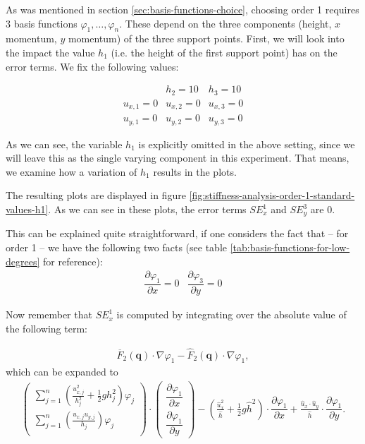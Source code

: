 \documentclass{article}
\newcommand{\pd}[2]{\dfrac{\partial #1}{\partial #2}}
\renewcommand{\phi}{\varphi}
\begin{document}
As was mentioned in section \ref{sec:basis-functions-choice}, choosing order 1 requires 3 basis functions $\phi_1,\dots,\phi_n$. These depend on the three components (height, $x$ momentum, $y$ momentum) of the three support points. First, we will look into the impact the value $h_1$ (i.e. the height of the first support point) has on the error terms. We fix the following values:

\begin{eqnarray*}
  & h_2 = 10 & h_3 = 10 \\
  u_{x,1} = 0 & u_{x,2} = 0 & u_{x,3} = 0 \\
  u_{y,1} = 0 & u_{y,2} = 0 & u_{y,3} = 0
\end{eqnarray*}

As we can see, the variable $h_1$ is explicitly omitted in the above setting, since we will leave this as the single varying component in this experiment. That means, we examine how a variation of $h_1$ results in the plots.



The resulting plots are displayed in figure \ref{fig:stiffness-analysis-order-1-standard-values-h1}. As we can see in these plots, the error terms $SE_x^1$ and $SE_y^3$ are 0.

This can be explained quite straightforward, if one considers the fact that -- for order 1 -- we have the following two facts (see table \ref{tab:basis-functions-for-low-degrees} for reference):
\begin{eqnarray*}
  \pd{\phi_1}{x} = 0 & \pd{\phi_3}{y} = 0
\end{eqnarray*}

Now remember that $SE_x^1$ is computed by integrating over the absolute value of the following term:

\begin{align*}
  \overline{F}_2(\mathbf{q}) \cdot \nabla \phi_1 - \widehat{F}_2(\mathbf{q}) \cdot \nabla \phi_1,
\end{align*}
which can be expanded to
\begin{align*}
  \begin{pmatrix}
    \sum_{j=1}^n \left(\frac{u_{x,j}^2}{h_j^2} + \frac{1}{2} g h_j^2\right) \phi_j \\
    \sum_{j=1}^n \left(\frac{u_{x,j} u_{y,j}}{h_j}\right) \phi_j \\
  \end{pmatrix}
  \cdot
  \begin{pmatrix}
    \pd{\phi_1}{x} \\
    \pd{\phi_1}{y}
  \end{pmatrix} -
  \left( \frac{\widehat{u}_x^2}{\widehat{h}} + \frac{1}{2} g \widehat{h}^2 \right) \cdot \pd{\phi_1}{x} +
  \frac{\widehat{u}_x \cdot \widehat{u}_y }{\widehat{h}} \cdot \pd{\phi_1}{y}.
\end{align*}
\end{document}
